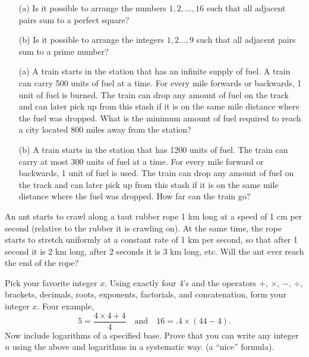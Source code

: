 \documentclass[12pt]{article}
\begin{document}
    \begin{exercise}
        \begin{enumerate}
            \item[(a)] Is it possible to arrange the numbers \(1,2,\ldots,16\) such that all adjacent pairs sum to a perfect square?
            \item[(b)] Is it possible to arrange the integers \(1,2\ldots,9\) such that all adjacent pairs sum to a prime number?
        \end{enumerate}
    \end{exercise}

    \begin{exercise}
        \begin{enumerate}
            \item[(a)] A train starts in the station that has an infinite supply of fuel.
            A train can carry 500 units of fuel at a time.
            For every mile forwards or backwards, 1 unit of fuel is burned.
            The train can drop any amount of fuel on the track and can later pick up from this stash if it is on the same mile distance where the fuel was dropped. 
            What is the minimum amount of fuel required to reach a city located 800 miles away from the station?
            \item[(b)] A train starts in the station that has 1200 units of fuel. 
            The train can carry at most 300 units of fuel at a time. 
            For every mile forward or backwards, 1 unit of fuel is used. 
            The train can drop any amount of fuel on the track and can later pick up from this stash if it is on the same mile distance where the fuel was dropped. 
            How far can the train go?
        \end{enumerate}
    \end{exercise}

    \begin{exercise}
        An ant starts to crawl along a taut rubber rope 1 km long at a speed of 1 cm per second (relative to the rubber it is crawling on). At the same time, the rope starts to stretch uniformly at a constant rate of 1 km per second, so that after 1 second it is 2 km long, after 2 seconds it is 3 km long, etc. Will the ant ever reach the end of the rope?
    \end{exercise}

    \begin{exercise}
        Pick your favorite integer \(x\). Using exactly four 4's and the operators \(+\), \(\times\), \(-\), \(\div\), brackets, decimals, roots, exponents, factorials, and concatenation, form your integer \(x\). Four example, 
        \[5 = \frac{4\times 4 + 4}{4}\quad\text{and}\quad 16 = .4\times (44-4).\]
        Now include logarithms of a specified base. Prove that you can write any integer \(n\) using the above and logarithms in a systematic way. (a ``nice'' formula).
    \end{exercise}
    
\end{document}
